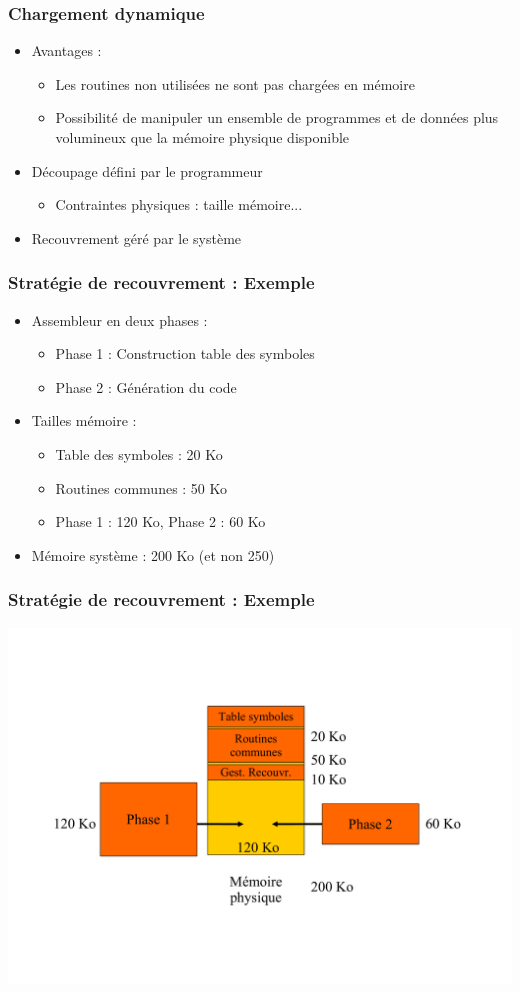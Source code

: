 \begin{frame}
\frametitle{Chargement dynamique}
\begin{itemize}
\item Avantages :
\begin{itemize}
\item Les routines non utilisées ne sont pas chargées en mémoire
\item Possibilité de manipuler un ensemble de programmes et de données plus volumineux que la mémoire physique disponible
\end{itemize}
\item Découpage défini par le programmeur
\begin{itemize}
\item Contraintes physiques : taille mémoire...
\end{itemize}
\item Recouvrement géré par le système
\end{itemize}
\end{frame}


\begin{frame}
\frametitle{Stratégie de recouvrement : Exemple}
\begin{itemize}
\item Assembleur en deux phases :
\begin{itemize}
\item Phase 1 : Construction table des symboles
\item Phase 2 : Génération du code
\end{itemize}
\item Tailles mémoire :
\begin{itemize}
\item Table des symboles : 20 Ko
\item Routines communes : 50 Ko
\item Phase 1 : 120 Ko, Phase 2 : 60 Ko
\end{itemize}
\item Mémoire système : 200 Ko (et non 250)
\end{itemize}
\end{frame}


\begin{frame}
\frametitle{Stratégie de recouvrement : Exemple}
\includegraphics[width=\textwidth]{../illustration/recouvrement_exemple.pdf}
\end{frame}


